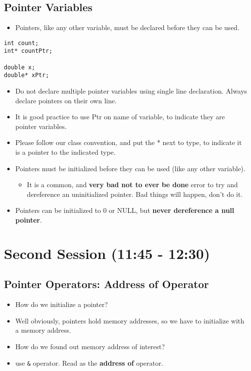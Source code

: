 \documentclass[11pt]{article}
\begin{document}
\subsection{Pointer Variables}
\label{sec-1-3}

\begin{itemize}
\item Pointers, like any other variable, must be declared before they can be used.
\end{itemize}

\begin{verbatim}
int count;
int* countPtr;

double x;
double* xPtr;
\end{verbatim}
\begin{itemize}
\item Do not declare multiple pointer variables using single line declaration. Always
  declare pointers on their own line.
\item It is good practice to use Ptr on name of variable, to indicate they
  are pointer variables.
\item Please follow our class convention, and put the * next to type, to indicate it is
  a pointer to the indicated type.
\item Pointers must be initialized before they can be used (like any other variable).
\begin{itemize}
\item It is a common, and \textbf{very bad not to ever be done} error to try and dereference
    an uninitialized pointer.  Bad things will happen, don't do it.
\end{itemize}
\item Pointers can be initialized to 0 or NULL, but \textbf{never dereference a null pointer}.
\end{itemize}
\section{Second Session (11:45 - 12:30)}
\label{sec-2}
\subsection{Pointer Operators: Address of Operator}
\label{sec-2-1}

\begin{itemize}
\item How do we initialize a pointer?
\item Well obviously, pointers hold memory addresses, so we have to initialize with a memory address.
\item How do we found out memory address of interest?
\item use \verb~&~ operator.  Read as the \textbf{address of} operator.
\end{itemize}
\end{document}
